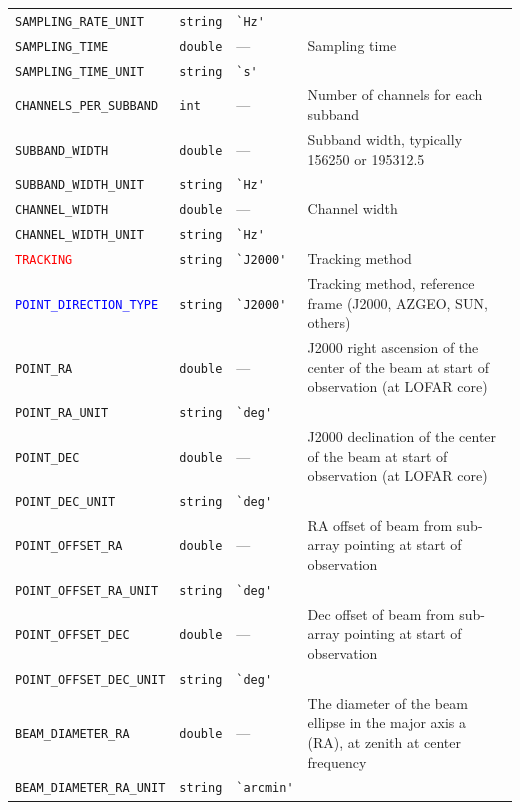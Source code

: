 \documentclass[a4paper,10pt,bibtotoc]{scrartcl}
\begin{document}
\begin{supertabular}{|lllp{5.5cm}|}
    \verb|SAMPLING_RATE_UNIT|    & \verb|string| & \verb|`Hz'| & \\
    \verb|SAMPLING_TIME|   & \verb|double|  & --- & Sampling time \\
    \verb|SAMPLING_TIME_UNIT|   & \verb|string| & \verb|`s'| & \\
    \verb|CHANNELS_PER_SUBBAND|  & \verb|int|& --- & Number of channels for each subband \\
    \verb|SUBBAND_WIDTH|    & \verb|double|  & --- & Subband width, typically 156250 or 195312.5 \\
    \verb|SUBBAND_WIDTH_UNIT|   & \verb|string| & \verb|`Hz'| & \\
    \verb|CHANNEL_WIDTH|    & \verb|double|  & --- & Channel width \\
    \verb|CHANNEL_WIDTH_UNIT|   & \verb|string| & \verb|`Hz'| & \\
  \small{\textcolor{red}{\texttt{TRACKING}}}  & \verb|string| & \verb|`J2000'| & Tracking method \\
  \textcolor{blue}{\texttt{POINT\_DIRECTION\_TYPE}} & \verb|string| & \verb|`J2000'| & Tracking method, reference frame (J2000, AZGEO, SUN, others) \\
  \small{\verb|POINT_RA|}  & \verb|double| & --- & J2000 right ascension of the center of the beam at start of observation (at LOFAR core) \\
  \small{\verb|POINT_RA_UNIT|}  & \verb|string| & \verb|`deg'| & \\
  \small{\verb|POINT_DEC|}  & \verb|double| & --- & J2000 declination of the center of the beam at start of observation (at LOFAR core) \\
  \small{\verb|POINT_DEC_UNIT|}  & \verb|string| & \verb|`deg'| & \\
  \small{\verb|POINT_OFFSET_RA|}  & \verb|double| & --- & RA offset of beam from sub-array pointing at start of observation \\
  \small{\verb|POINT_OFFSET_RA_UNIT|}  & \verb|string| & \verb|`deg'| & \\
  \small{\verb|POINT_OFFSET_DEC|}  & \verb|double| & --- & Dec offset of beam from sub-array pointing at start of observation \\
  \small{\verb|POINT_OFFSET_DEC_UNIT|}  & \verb|string| & \verb|`deg'| & \\
  \small{\verb|BEAM_DIAMETER_RA|}  & \verb|double| & --- & The diameter of the beam ellipse in the major axis a (RA), at zenith at center frequency \\
  \small{\verb|BEAM_DIAMETER_RA_UNIT|}  & \verb|string| & \verb|`arcmin'| & \\

\end{supertabular}
\end{document}
